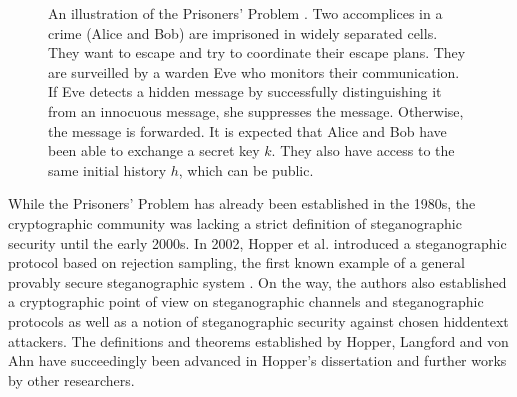 \begin{figure}[htbp]
\centering
{}
\caption{
An illustration of the Prisoners' Problem \cite{Simmons1983}.
Two accomplices in a crime (Alice and Bob) are imprisoned in widely separated cells.
They want to escape and try to coordinate their escape plans.
They are surveilled by a warden Eve who monitors their communication.
If Eve detects a hidden message by successfully distinguishing it from an innocuous message, she suppresses the message.
Otherwise, the message is forwarded.
It is expected that Alice and Bob have been able to exchange a secret key $k$.
They also have access to the same initial history $h$, which can be public.
}
\label{fig:prisonersgame}
\end{figure}

While the Prisoners' Problem has already been established in the 1980s, the cryptographic community was lacking a strict definition of steganographic security until the early 2000s.
In 2002, Hopper et al. introduced a steganographic protocol based on rejection sampling, the first known example of a general provably secure steganographic system \cite{HLA2002}.
On the way, the authors also established a cryptographic point of view on steganographic channels and steganographic protocols as well as a notion of steganographic security against chosen hiddentext attackers.
The definitions and theorems established by Hopper, Langford and von Ahn have succeedingly been advanced in Hopper's dissertation \cite{Hopper2004} and further works by other researchers.


